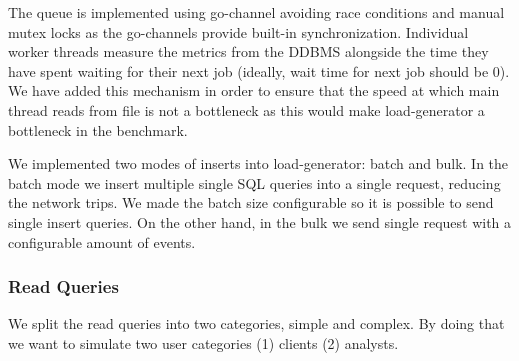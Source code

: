 \begin{figure}[ht]
  \label{fig:load-generator-diagram}
  \caption{}
\end{figure}

The queue is implemented using go-channel avoiding race conditions and manual mutex locks as the go-channels provide built-in synchronization.
Individual worker threads measure the metrics from the DDBMS alongside the time they have spent waiting for their next job (ideally, wait time for next job should be 0).
We have added this mechanism in order to ensure that the speed at which main thread reads from file is not a bottleneck as this would make load-generator a bottleneck in the benchmark.

We implemented two modes of inserts into load-generator: batch and bulk.
In the batch mode we insert multiple single SQL queries into a single request, reducing the network trips.
We made the batch size configurable so it is possible to send single insert queries.
On the other hand, in the bulk we send single request with a configurable amount of events.

\subsubsection{Read Queries}

We split the read queries into two categories, simple and complex.
By doing that we want to simulate two user categories (1) clients (2) analysts.


